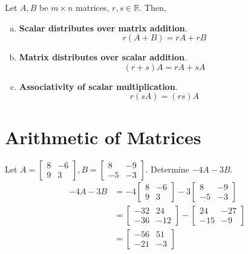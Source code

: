 \documentclass[letterpaper,12pt]{article}
\begin{document}
\begin{theorem}
Let $A, B$ be $m \times n$ matrices, $r, s \in \mathbb{R}$. Then,
\begin{enumerate}[(a)]
    \item \textbf{Scalar distributes over matrix addition}.
    \begin{equation*}
        r(A + B) = rA + rB
    \end{equation*}
    \item \textbf{Matrix distributes over scalar addition}.
    \begin{equation*}
        (r + s)A = rA + sA
    \end{equation*}
    \item \textbf{Associativity of scalar multiplication}.
    \begin{equation*}
        r(sA) = (rs) A
    \end{equation*}
\end{enumerate}
\end{theorem}


\section*{Arithmetic of Matrices}
\begin{example}
Let $A = \begin{bmatrix} 8 & -6 \\ 9 & 3 \end{bmatrix}, B = \begin{bmatrix} 8 & -9 \\ -5 & -3 \end{bmatrix}$. Determine $-4A - 3B$.
\begin{align*}
    -4A - 3B & = -4 \begin{bmatrix} 8 & -6 \\ 9 & 3 \end{bmatrix} - 3 \begin{bmatrix} 8 & -9 \\ -5 & -3 \end{bmatrix} \\
    & = \begin{bmatrix} -32 & 24 \\ -36 & -12 \end{bmatrix} - \begin{bmatrix} 24 & -27 \\ -15 & -9 \end{bmatrix} \\
    & = \begin{bmatrix} -56 & 51 \\ -21 & -3 \end{bmatrix}
\end{align*}
\end{example}
\end{document}
